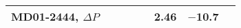 \documentclass{article}
\newcommand{\chem}[1]{\ensuremath{\mathrm{#1}}}
\newcommand{\degree}[0]{\ensuremath{^{\circ}}}
\begin{document}
\begin{table*}
{\begin{tabular}{lccccccl}
        MD01-2444, $\Delta P$ &&&&& 2.46 & $-$10.7 \\

        \bottomrule
      \end{tabular}}


    \end{table*}


\end{document}

